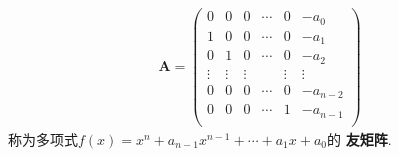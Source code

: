 \documentclass[../../main.tex]{subfiles}
\begin{document}
\begin{definition}[友矩阵]
\begin{align*}
\boldsymbol{A}=\left( \begin{matrix}
0&		0&		0&		\cdots&		0&		-a_0\\
1&		0&		0&		\cdots&		0&		-a_1\\
0&		1&		0&		\cdots&		0&		-a_2\\
\vdots&		\vdots&		\vdots&		&		\vdots&		\vdots\\
0&		0&		0&		\cdots&		0&		-a_{n-2}\\
0&		0&		0&		\cdots&		1&		-a_{n-1}\\
\end{matrix} \right) 
\end{align*}
称为多项式$f\left( x \right) =x^n+a_{n-1}x^{n-1}+\cdots +a_1x+a_0$的
\textbf{友矩阵}.
\end{definition}
\end{document}
